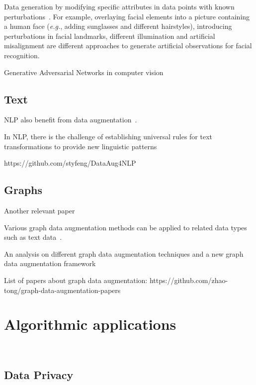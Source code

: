 \documentclass[parskip=full]{scrartcl}
\begin{document}
Data generation by modifying specific attributes in data points with known
perturbations~\cite{lv2017data}. For example, overlaying facial elements into
a picture containing a human face (\textit{e.g.}, adding sunglasses and
different hairstyles), introducing perturbations in facial landmarks,
different illumination and artificial misalignment are different approaches to
generate artificial observations for facial recognition.

Generative Adversarial Networks in computer vision~\cite{wang2021generative}


\subsection{Text}

NLP also benefit from data augmentation~\cite{feng2021survey}.

In NLP, there is the challenge of establishing universal rules for text
transformations to provide new linguistic patterns~\cite{bayer2022data}

https://github.com/styfeng/DataAug4NLP

\subsection{Graphs}


Another relevant paper~\cite{zhou2020data}

Various graph data augmentation methods can be applied to related data types
such as text data~\cite{shorten2021text}.


An analysis on different graph data augmentation techniques and a new graph
data augmentation framework~\citet{zhao2021data}

List of papers about graph data augmentation:
https://github.com/zhao-tong/graph-data-augmentation-papers

\section{Algorithmic applications}~\label{sec:algorithmic-applications}

\subsection{Data Privacy}
\end{document}
